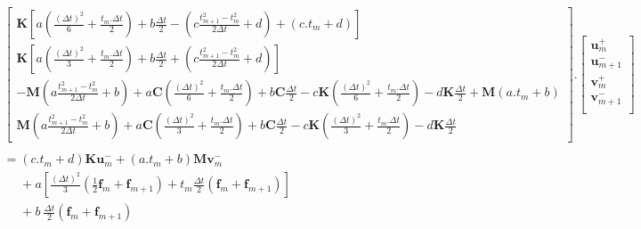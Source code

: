 \documentclass[12pt,a4paper]{report}
\begin{document}
\begin{equation}
\!\!\!\!\!\!\!\!\!\!\!\!\!\!\!\!\!\!\!\!\!\!\!\!\!\!\!\!\!\!\!\!\!\!\!
\begin{array}{l }
	\begin{bmatrix}	   
		   \mathbf{K} \left[
			   a \left( \frac{(\Delta t)^2}{6} + \frac{t_m.\Delta t}{2}
			   		\right)
			   +b \frac{\Delta t}{2} 
			   -\left( c\frac{t_{m+1}^2 - t_m^2}{2\Delta t} + d \right)
			   + (c.t_m + d)
			\right]
		\\   
		   \mathbf{K} \left[
			   a \left( \frac{(\Delta t)^2}{3} + \frac{t_m.\Delta t}{2}
			   		\right)
			   +b \frac{\Delta t}{2} 
			   + \left( c\frac{t_{m+1}^2 - t_m^2}{2 \Delta t} + d \right)
			\right]
		\\   
		   -\mathbf{M}
		   		\left( a\frac{t_{m+1}^2 - t_m^2}{2\Delta t} + b \right)
		   +a\mathbf{C}
		   		(\frac{(\Delta t)^2}{6} + \frac{t_m.\Delta t}{2})
		   +b\mathbf{C} \frac{\Delta t}{2}
		   -c\mathbf{K}
		   		(\frac{(\Delta t)^2}{6} + \frac{t_m.\Delta t}{2})
		   -d\mathbf{K} \frac{\Delta t}{2}
		   +\mathbf{M} (a.t_m + b)
		\\   
		   \mathbf{M}
		   		\left( a\frac{t_{m+1}^2 - t_m^2}{2\Delta t} + b \right)
		   +a\mathbf{C}
		   		(\frac{(\Delta t)^2}{3} + \frac{t_m.\Delta t}{2})
		   +b\mathbf{C} \frac{\Delta t}{2}
		   -c\mathbf{K}
		   		(\frac{(\Delta t)^2}{3} + \frac{t_m.\Delta t}{2})
		   -d\mathbf{K} \frac{\Delta t}{2}
	\end{bmatrix}
	.
	\begin{bmatrix}
		   \mathbf{u}_m^+  		\\
		   \mathbf{u}_{m+1}^-  	\\
		   \mathbf{v}_m^+  		\\
		   \mathbf{v}_{m+1}^-  	\\
	\end{bmatrix}
	\\
	\\
		= 
	     (c.t_m+d) \mathbf{K} \mathbf{u}_m^-
	   + (a.t_m+b) \mathbf{M} \mathbf{v}_m^-
	\\ \phantom{=} +\displaystyle
		a \left[
			\frac{(\Delta t)^2}{3}
				\left( \frac{1}{2} \mathbf{f}_m + \mathbf{f}_{m+1} \right)
			+t_m \frac{\Delta t}{2} (\mathbf{f}_m + \mathbf{f}_{m+1}) 
		\right]
	\\ \phantom{=} +\displaystyle
		 b~ \frac{\Delta t}{2}  (\mathbf{f}_m + \mathbf{f}_{m+1})
	
\end{array}
\end{equation}
\end{document}
